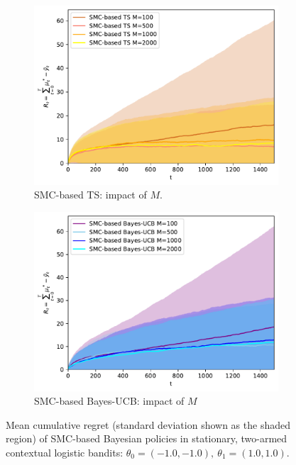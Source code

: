 \begin{figure}[!h]
	\begin{subfigure}[b]{0.46\textwidth}
		\centering
		\includegraphics[width=\textwidth]{./fods_figs/static/logistic/A2/theta-1._-1._1._1._allM_cumulative_regret_ts}
		\caption{SMC-based TS: impact of $M$.}
	\end{subfigure}
	\begin{subfigure}[b]{0.46\textwidth}
		\centering
		\includegraphics[width=\textwidth]{./fods_figs/static/logistic/A2/theta-1._-1._1._1._allM_cumulative_regret_bucb}
		\caption{SMC-based Bayes-UCB: impact of $M$}
	\end{subfigure}
	
	\caption{Mean cumulative regret (standard deviation shown as the shaded region) of SMC-based Bayesian policies in
		stationary, two-armed contextual logistic bandits:
		$\theta_0=(-1.0,-1.0), \ \theta_1=(1.0,1.0)$.}
\end{figure}

